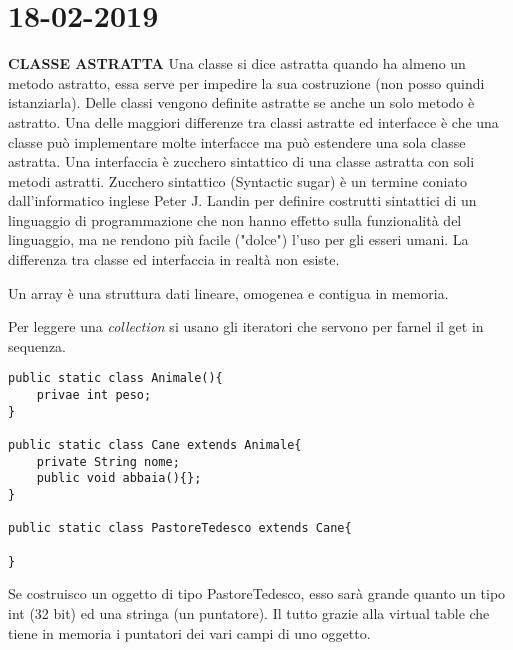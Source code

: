 
\newpage
\section{18-02-2019}
\textbf{CLASSE ASTRATTA} \newline
Una classe si dice astratta quando ha almeno un metodo astratto, essa serve per impedire la sua costruzione (non posso quindi istanziarla). Delle classi vengono definite astratte se anche un solo metodo è astratto. Una delle maggiori differenze tra classi astratte ed interfacce è che una classe può implementare molte interfacce ma può estendere una sola classe astratta. Una interfaccia è zucchero sintattico di una classe astratta con soli metodi astratti. Zucchero sintattico (Syntactic sugar) è un termine coniato dall'informatico inglese Peter J. Landin per definire costrutti sintattici di un linguaggio di programmazione che non hanno effetto sulla funzionalità del linguaggio, ma ne rendono più facile ("dolce") l'uso per gli esseri umani. La differenza tra classe ed interfaccia in realtà non esiste.

\noindent Un array è una struttura dati lineare, omogenea e contigua in memoria. \newline

\noindent Per leggere una \textit{collection} si usano gli iteratori che servono per farnel il get in sequenza.
\begin{lstlisting}[basicstyle=\small,]
public static class Animale(){
	privae int peso;
}

public static class Cane extends Animale{
	private String nome;
	public void abbaia(){};
}

public static class PastoreTedesco extends Cane{

}
\end{lstlisting}
Se costruisco un oggetto di tipo PastoreTedesco, esso sarà grande quanto un tipo int (32 bit) ed una stringa (un puntatore).
Il tutto grazie alla virtual table che tiene in memoria i puntatori dei vari campi di uno oggetto.






